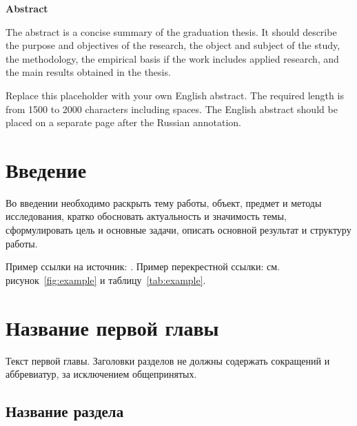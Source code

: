 \documentclass[14pt,a4paper]{extreport}
\numberwithin{figure}{chapter}
\numberwithin{table}{chapter}
\numberwithin{equation}{chapter}
\newcommand{\annotationpage}[2]{
    \clearpage
    \thispagestyle{empty}
    \begin{center}
        \textbf{#1}
    \end{center}

    #2
}
\begin{document}
\annotationpage{\textenglish{Abstract}}{
\begin{english}
The abstract is a concise summary of the graduation thesis. It should describe
the purpose and objectives of the research, the object and subject of the study,
the methodology, the empirical basis if the work includes applied research,
and the main results obtained in the thesis.

Replace this placeholder with your own English abstract. The required length is
from 1500 to 2000 characters including spaces. The English abstract should be
placed on a separate page after the Russian annotation.
\end{english}
}

\clearpage
{}

\tableofcontents
\clearpage

\chapter*{Введение}

Во введении необходимо раскрыть тему работы, объект, предмет и методы
исследования, кратко обосновать актуальность и значимость темы, сформулировать
цель и основные задачи, описать основной результат и структуру работы.

Пример ссылки на источник: \cite{example-source}.
Пример перекрестной ссылки: см. рисунок~\ref{fig:example} и таблицу~\ref{tab:example}.

\chapter{Название первой главы}

Текст первой главы. Заголовки разделов не должны содержать сокращений и
аббревиатур, за исключением общепринятых.

\section{Название раздела}
\end{document}
